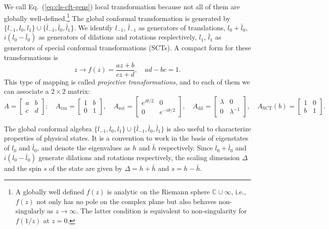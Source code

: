 \documentclass[aps,prb,superscriptaddress,nofootinbib]{revtex4}
\begin{document}
We call Eq.~(\ref{eq:cls-cft-gens}) local transformation because not all of them are globally well-defined.\footnote{A globally well defined $f(z)$ is analytic on the Riemann sphere $\mathbb C\cup \infty$, i.e., $f(z)$ not only has no pole on the complex plane but also behaves non-singularly as $z\rightarrow \infty$. The latter condition is equivalent to non-singularity for $f(1/z)$ at $z=0$.}
The global conformal transformation is generated by $\{l_{-1},l_0,l_1\}\cup\{\bar l_{-1},\bar l_0,\bar l_1\}$.
We identify $l_{-1}$, $\bar l_{-1}$ as generators of translations, $l_{0}+\bar l_{0}$, $i(l_{0}-\bar l_{0})$ as generators of dilations and rotations resplectively, $l_{1}$, $\bar l_{1}$ as generators of special conformal transformations (SCTs).
A compact form for these transformations is
\begin{equation}
	z \rightarrow f(z) = \frac{a z + b}{c z + d},\quad ad-bc = 1.
\end{equation}
This type of mapping is called \textit{projective transformations}, and to each of them we can associate a $2\times2$ matrix:
\begin{equation}
	A = \begin{bmatrix} a & b \\ c & d \end{bmatrix}: \quad
	A_\text{trn} = \begin{bmatrix} 1 & b \\ 0 & 1 \end{bmatrix}, \quad
	A_\text{rot} = \begin{bmatrix} e^{i\theta/2} & 0 \\ 0 & e^{-i\theta/2} \end{bmatrix}, \quad
	A_\text{dil} = \begin{bmatrix} \lambda & 0 \\ 0 & \lambda^{-1} \end{bmatrix}, \quad
	A_{\mathrm{SCT}}(b) = \begin{bmatrix} 1 & 0 \\ b & 1 \end{bmatrix}.
\end{equation}

The global conformal algebra $\{l_{-1},l_0,l_1\}\cup\{\bar l_{-1},\bar l_0,\bar l_1\}$ is also useful to characterize properties of physical states.
It is a convention to work in the basis of eigenstates of $l_0$ and $\bar l_0$, and denote the eigenvalues as $h$ and $\bar h$ respectively.
Since $l_{0}+\bar l_{0}$ and $i(l_{0}-\bar l_{0})$ generate dilations and rotations respectively, the scaling dimension $\Delta$ and the spin $s$ of the state are given by $\Delta=h+\bar h$ and $s = h-\bar h$.
\end{document}
